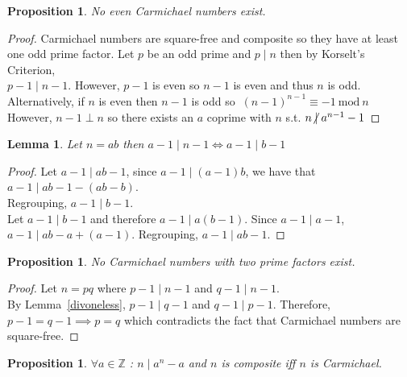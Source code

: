 \documentclass[12pt]{extarticle}
\renewcommand\qedsymbol{$\square$}
\newcommand{\divides}{\mid}
\newcommand{\ndivides}{\centernot \mid}
\newcommand{\Z}{\mathbb{Z}}
\newtheorem{lemma}[theorem]{Lemma}
\newtheorem{proposition}[theorem]{Proposition}
\newenvironment{lproof}{\begin{proof} \renewcommand{\qedsymbol}{}}{\end{proof}}
\renewcommand{\mod}[3]{\: #1 \equiv #2 \: \mathrm{mod} \: #3 \:}
\begin{document}
\begin{proposition} No even Carmichael numbers exist.
\end{proposition}
\begin{lproof}
Carmichael numbers are square-free and composite so they have at least one odd prime factor. Let $p$ be an odd prime and $p \divides n$ then by Korselt's Criterion, \\ $p-1 \divides n-1$. However, $p-1$ is even so $n-1$ is even and thus $n$ is odd. \\ Alternatively, if $n$ is even then $n-1$ is odd so $\mod{(n-1)^{n-1}}{-1}{n}$ \\ However, $n-1 \perp n$ so  there exists an $a$ coprime with $n$ s.t. $n \ndivides a^{n-1}-1$
\end{lproof}

\begin{lemma}
Let $n = ab$ then $a - 1 \divides n - 1 \iff a - 1 \divides b - 1$
\end{lemma}

\begin{lproof}
\label{divoneless}
Let $a-1 \divides ab - 1$, since $a-1 \divides (a-1)b$, we have that $a-1 \divides ab - 1 - (ab - b)$. \\
Regrouping, $a-1 \divides b-1$.
\\

\noindent Let $a - 1 \divides b - 1$ and therefore $a - 1 \divides a(b - 1)$. Since $a-1 \divides a-1$, \\ $a-1 \divides ab - a + (a-1)$. Regrouping, $a-1 \divides ab - 1$.
\end{lproof}

\begin{proposition} No Carmichael numbers with two prime factors exist.
\end{proposition}
\begin{lproof}
Let $n = pq$ where $p-1 \divides n - 1$ and $q-1 \divides n - 1$. \\ By Lemma~\ref{divoneless}, $p-1 \divides q-1$ and $q-1 \divides p-1$. Therefore, $p-1 = q-1 \implies p = q$ which contradicts the fact that Carmichael numbers are square-free.
\end{lproof}

\begin{proposition} $\forall a \in \Z$ : $n \divides a^n - a$ and $n$ is composite iff $n$ is Carmichael.
\end{proposition}
\end{document}
